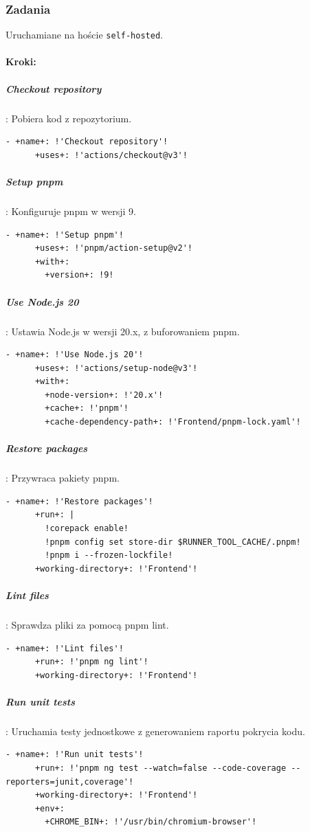 \subsubsection{Zadania}
Uruchamiane na hoście \texttt{\textcolor{codeblue}{self-hosted}}.
\paragraph{Kroki:}
\subparagraph{Checkout repository}: Pobiera kod z repozytorium.
\begin{lstlisting}[style=yaml-colored]
    - +name+: !'Checkout repository'!
      +uses+: !'actions/checkout@v3'!
\end{lstlisting}

\subparagraph{Setup pnpm}: Konfiguruje pnpm w wersji 9.
\begin{lstlisting}[style=yaml-colored]
    - +name+: !'Setup pnpm'!
      +uses+: !'pnpm/action-setup@v2'!
      +with+:
        +version+: !9!
\end{lstlisting}

\subparagraph{Use Node.js 20}: Ustawia Node.js w wersji 20.x, z buforowaniem pnpm.
\begin{lstlisting}[style=yaml-colored]
    - +name+: !'Use Node.js 20'!
      +uses+: !'actions/setup-node@v3'!
      +with+:
        +node-version+: !'20.x'!
        +cache+: !'pnpm'!
        +cache-dependency-path+: !'Frontend/pnpm-lock.yaml'!
\end{lstlisting}

\subparagraph{Restore packages}: Przywraca pakiety pnpm.
\begin{lstlisting}[style=yaml-colored]
    - +name+: !'Restore packages'!
      +run+: |
        !corepack enable!
        !pnpm config set store-dir $RUNNER_TOOL_CACHE/.pnpm!
        !pnpm i --frozen-lockfile!
      +working-directory+: !'Frontend'!
\end{lstlisting}

\subparagraph{Lint files}: Sprawdza pliki za pomocą pnpm lint.
\begin{lstlisting}[style=yaml-colored]
    - +name+: !'Lint files'!
      +run+: !'pnpm ng lint'!
      +working-directory+: !'Frontend'!
\end{lstlisting}

\subparagraph{Run unit tests}: Uruchamia testy jednostkowe z generowaniem raportu pokrycia kodu.
\begin{lstlisting}[style=yaml-colored]
    - +name+: !'Run unit tests'!
      +run+: !'pnpm ng test --watch=false --code-coverage --reporters=junit,coverage'!
      +working-directory+: !'Frontend'!
      +env+:
        +CHROME_BIN+: !'/usr/bin/chromium-browser'!
\end{lstlisting}

